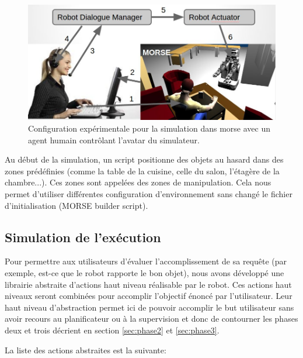 \documentclass[a4paper,11pt,twoside]{StyleThese}
\begin{document}
\begin{figure}[ht!]
 \centering
  \includegraphics[width=0.89\linewidth]{./img/simusetup.jpg}
  \caption {Configuration expérimentale pour la simulation dans morse avec un agent humain contrôlant l'avatar du simulateur.}
  \label{fig:simusetup}
\end{figure}

 
Au début de la simulation, un script positionne des objets au hasard dans des zones prédéfinies (comme la table de la cuisine, celle du salon, l'étagère de la chambre...). Ces zones sont appelées des zones de manipulation. Cela nous permet d'utiliser différentes configuration d'environnement sans changé le fichier d'initialisation (MORSE builder script).

\subsection{Simulation de l'exécution}
\label{section:actions}
Pour permettre aux utilisateurs d'évaluer l'accomplissement de sa requête (par exemple, est-ce que le robot rapporte le bon objet), nous avons développé une librairie abstraite d'actions haut niveau réalisable par le robot. Ces actions haut niveaux seront combinées pour accomplir l'objectif énoncé par l'utilisateur. Leur haut niveau d'abstraction permet ici de pouvoir accomplir le but utilisateur sans avoir recours au planificateur ou à la supervision et donc de contourner les phases deux et trois décrient en section \ref{sec:phase2} et \ref{sec:phase3}.

La liste des actions abstraites est la suivante:
\end{document}
